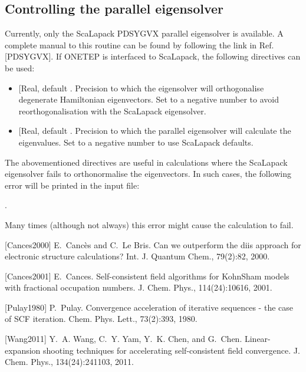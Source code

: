\documentclass[letterpaper,10pt,english]{sphinxmanual}
\begin{document}
\subsection{Controlling the parallel eigensolver}
\label{\detokenize{onetep_kernel_diis_documentation:controlling-the-parallel-eigensolver}}
Currently, only the ScaLapack PDSYGVX parallel eigensolver is available.
A complete manual to this routine can be found by following the link in
Ref. {[}PDSYGVX{]}. If ONETEP is interfaced to ScaLapack,
the following directives can be used:
\begin{itemize}
\item {} 
 {[}Real, default
\sphinxcode{eigensolver\_orfac: 1.0e-4}{]}. Precision to which the eigensolver
will orthogonalise degenerate Hamiltonian eigenvectors. Set to a
negative number to avoid reorthogonalisation with the ScaLapack
eigensolver.

\item {} 
 {[}Real, default
\sphinxcode{eigensolver\_abstol: 1.0e-9}{]}. Precision to which the parallel
eigensolver will calculate the eigenvalues. Set to a negative number
to use ScaLapack defaults.

\end{itemize}

The abovementioned directives are useful in calculations where the
ScaLapack eigensolver fails to orthonormalise the eigenvectors. In such
cases, the following error will be printed in the input file:

.

Many times (although not always) this error might cause the calculation
to fail.

{[}Cances2000{]} E. Cancès and C. Le Bris. Can we outperform the diis approach for electronic structure calculations? Int. J. Quantum Chem., 79(2):82, 2000.

{[}Cances2001{]} E. Cances. Self-consistent field algorithms for Kohn\textendash{}Sham models with fractional occupation numbers. J. Chem. Phys., 114(24):10616, 2001.

{[}Pulay1980{]} P. Pulay. Convergence acceleration of iterative sequences - the case of SCF iteration. Chem. Phys. Lett., 73(2):393, 1980.

{[}Wang2011{]} Y. A. Wang, C. Y. Yam, Y. K. Chen, and G. Chen. Linear-expansion shooting techniques for accelerating self-consistent field convergence. J. Chem. Phys., 134(24):241103, 2011.
\end{document}
